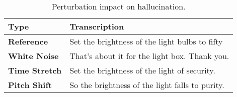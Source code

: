 \begin{table}[h!]
\centering
\small
\renewcommand{\arraystretch}{1.3}
\begin{tabular}{l p{4cm}}
\hline
\vspace{2pt}
\textbf{Type} & \textbf{Transcription}  \\
\hline
\textbf{Reference} & Set the brightness of the light bulbs to fifty  \\
\textbf{White Noise} & That's about it for the light box. Thank you. \\
\textbf{Time Stretch} & Set the brightness of the light of security.  \\
\textbf{Pitch Shift} & So the brightness of the light falls to purity.  \\
\hline
\end{tabular}
\caption{Perturbation impact on hallucination.}
\label{tab:perturb impact}
\end{table}


